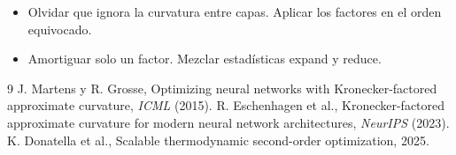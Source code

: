 \documentclass[11pt,a4paper]{article}
\begin{document}
\begin{error}
\begin{itemize}[nosep]
\item Olvidar que ignora la curvatura entre capas. \quad Aplicar los factores en el orden equivocado.
\item Amortiguar solo un factor. \quad Mezclar estadísticas expand y reduce.
\end{itemize}
\end{error}

\begin{thebibliography}{9}\small
{} J. Martens y R. Grosse, Optimizing neural networks with Kronecker-factored approximate curvature, \emph{ICML} (2015).
 R. Eschenhagen et al., Kronecker-factored approximate curvature for modern neural network architectures, \emph{NeurIPS} (2023).
 K. Donatella et al., Scalable thermodynamic second-order optimization, 2025.
\end{thebibliography}
\end{document}
